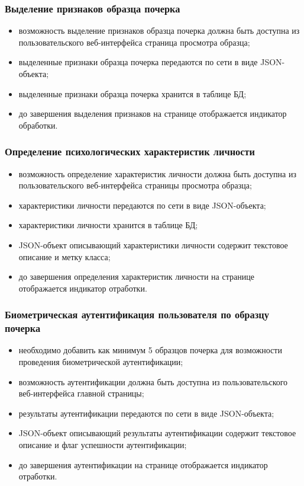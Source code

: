 \subsubsection{Выделение признаков образца почерка}
\label{sec:freq:extract_features}
\begin{itemize}
	\item возможность выделение признаков образца почерка должна быть доступна из пользовательского веб-интерфейса страница просмотра образца;
	\item выделенные признаки образца почерка передаются по сети в виде JSON-объекта;
	\item выделенные признаки образца почерка хранится в таблице БД;
	\item до завершения выделения признаков на странице отображается индикатор обработки.
\end{itemize}

\subsubsection{Определение психологических характеристик личности}
\label{sec:freq:psiho_analysis}
\begin{itemize}
	\item возможность определение характеристик личности должна быть доступна из пользовательского веб-интерфейса страницы просмотра образца;
	\item характеристики личности передаются по сети в виде JSON-объекта;
	\item характеристики личности хранится в таблице БД;
	\item JSON-объект описывающий характеристики личности содержит текстовое описание и метку класса;
	\item до завершения определения характеристик личности на странице отображается индикатор отработки.
\end{itemize}

\subsubsection{Биометрическая аутентификация пользователя по образцу почерка}
\label{sec:freq:bio_identification}
\begin{itemize}
	\item необходимо добавить как минимум 5 образцов почерка для возможности проведения биометрической аутентификации;
	\item возможность аутентификации должна быть доступна из пользовательского веб-интерфейса главной страницы;
	\item результаты аутентификации передаются по сети в виде JSON-объекта;
	\item JSON-объект описывающий результаты аутентификации содержит текстовое описание и флаг успешности аутентификации;
	\item до завершения аутентификации на странице отображается индикатор отработки.
\end{itemize}


